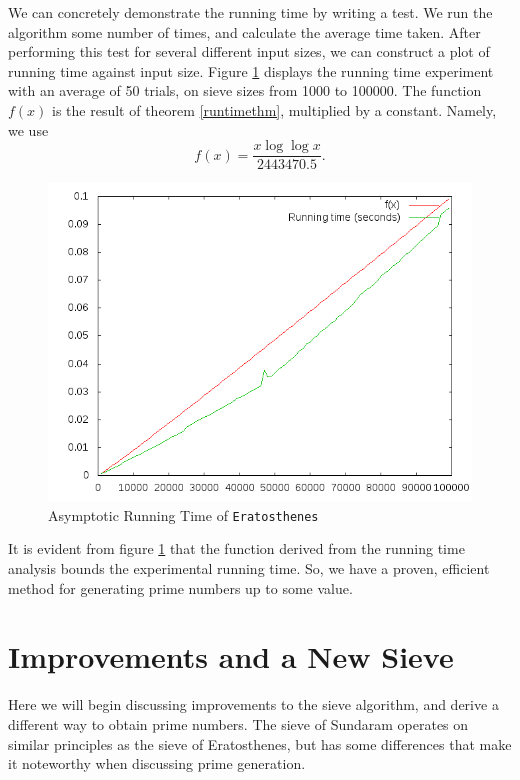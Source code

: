 \documentclass{amsart}
\theoremstyle{definition}
\theoremstyle{case}
\begin{document}
	We can concretely demonstrate the running time by writing a test. We run the algorithm some number of times, and calculate the average time taken. After performing this test for several different input sizes, we can construct a plot of running time against input size. Figure \ref{runtime1} displays the running time experiment with an average of 50 trials, on sieve sizes from 1000 to 100000. The function $f(x)$ is the result of theorem \ref{runtimethm}, multiplied by a constant. Namely, we use
	$$ f(x) = \frac{x \log \log x}{2443470.5} . $$
	
	\begin{figure}\caption{Asymptotic Running Time of \texttt{Eratosthenes}}
		\label{runtime1}
		\includegraphics[scale=0.5]{erat3.png}
	\end{figure}
	
	It is evident from figure \ref{runtime1} that the function derived from the running time analysis bounds the experimental running time. So, we have a proven, efficient method for generating prime numbers up to some value.
	
	\section{Improvements and a New Sieve}
	
	Here we will begin discussing improvements to the sieve algorithm, and derive a different way to obtain prime numbers. The sieve of Sundaram operates on similar principles as the sieve of Eratosthenes, but has some differences that make it noteworthy when discussing prime generation.
	
\end{document}
